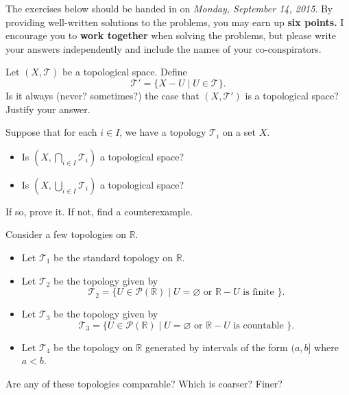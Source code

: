 \documentclass[12pt]{pset}
\author{Jim Fowler}
\date{Autumn 2015}
\newcommand{\RR}{\mathbb{R}}
\newcommand{\TT}{\mathscr{T}}
\begin{document}
\maketitle

\noindent The exercises below should be handed in on \textit{Monday, September
  14, 2015}.  By providing well-written solutions to the problems, you
may earn up \textbf{six points.}  I encourage you to \textbf{work
  together} when solving the problems, but please write your answers
independently and include the names of your co-conspirators.

\begin{problem}

  Let $(X,\TT)$ be a topological space.  Define
  \[
  \TT' = \{ X - U \mid U \in \TT \}.
  \]
  Is it always (never? sometimes?) the case that $(X,\TT')$ is a
  topological space?  \\
  Justify your answer.

\end{problem}

\begin{problem}

  Suppose that for each $i \in I$, we have a topology $\TT_i$ on a set $X$.
  \begin{itemize}
  \item Is $\left( X, \displaystyle\bigcap_{i \in I} \TT_i \right)$ a topological space?
  \item Is $\left( X, \displaystyle\bigcup_{i \in I} \TT_i \right)$ a topological space?
  \end{itemize}
  If so, prove it.  If not, find a counterexample.

\end{problem}

\begin{problem}

  Consider a few topologies on $\RR$.
  \begin{itemize}
  \item Let $\TT_1$ be the standard topology on $\RR$.
  \item Let $\TT_2$ be the topology given by
    \[
    \TT_2 = \{ U \in \mathcal{P}(\RR) \mid U = \varnothing \mbox{ or } \RR - U \mbox{ is finite } \}.
    \]
  \item Let $\TT_3$ be the topology given by
    \[
    \TT_3 = \{ U \in \mathcal{P}(\RR) \mid U = \varnothing \mbox{ or } \RR - U \mbox{ is countable } \}.
    \]
  \item Let $\TT_4$ be the topology on $\RR$ generated by intervals of the
    form $(a,b]$ where $a < b$.
  \end{itemize}
  Are any of these topologies comparable?  Which is coarser?  Finer?

\end{problem}
\end{document}
